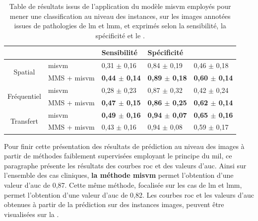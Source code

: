 \begin{table}[H]
    \centering
    \begin{tabular}{cllll}
        \toprule
        \multicolumn{1}{l}{}         &                      & Sensibilité               & Spécificité               & \Fscore{}                 \\ \midrule
        \multirow{2}{*}{Spatial}     & \gls{misvm}          & 0,31 $\pm$ 0,16             & 0,84 $\pm$ 0,19             & 0,46 $\pm$ 0,18             \\
                                     & MMS + \gls{misvm}    & \textbf{0,44 $\pm$ 0,14}    & \textbf{0,89 $\pm$ 0,18}    & \textbf{0,60 $\pm$ 0,14}    \\ \midrule
        \multirow{2}{*}{Fréquentiel} & \gls{misvm}          & 0,28 $\pm$ 0,23             & 0,87 $\pm$ 0,32             & 0,42 $\pm$ 0,24             \\
                                     & MMS + \gls{misvm}    & \textbf{0,47 $\pm$ 0,15}    & \textbf{0,86 $\pm$ 0,25}    & \textbf{0,62 $\pm$ 0,14}    \\ \midrule
        \multirow{2}{*}{Transfert}   & \gls{misvm}          & \textbf{0,49 $\pm$ 0,16}    & \textbf{0,94 $\pm$ 0,07}    & \textbf{0,65 $\pm$ 0,16}    \\
                                     & MMS + \gls{misvm}    & 0,43 $\pm$ 0,16             & 0,94 $\pm$ 0,08             & 0,59 $\pm$ 0,17             \\ \bottomrule
    \end{tabular}
    \caption{Table de résultats issus de l'application du modèle \gls{misvm} employés pour mener une classification au niveau des instances, sur les images annotées issues de pathologies de \gls{lm} et \gls{lmm}, et exprimés selon la sensibilité, la spécificité et le \fscore{}.}
    \label{tab:results_lesion_classification_weakly_image_lm}
\end{table}

Pour finir cette présentation des résultats de prédiction au niveau des images à partir de méthodes faiblement supervisées employant le principe du \gls{mil}, ce paragraphe présente les résultats des courbes \gls{roc} et des valeurs d'\gls{auc}. Ainsi sur l'ensemble des cas cliniques, \textbf{la méthode \gls{misvm}} permet l'obtention d'une valeur d'\gls{auc} de 0,87. Cette même méthode, focalisée sur les cas de \gls{lm} et \gls{lmm}, permet l'obtention d'une valeur d'\gls{auc} de 0,82. Les courbes \gls{roc} et les valeurs d'\gls{auc} obtenues à partir de la prédiction sur des instances images, peuvent être visualisées sur la .\par

